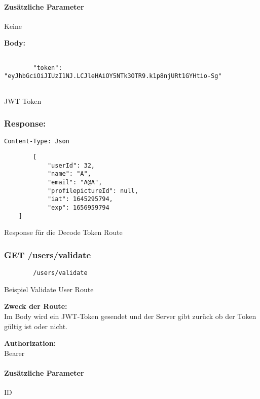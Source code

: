 \paragraph{Zusätzliche Parameter}
Keine

\textbf{Body:}

\begin{code}
    \begin{lstlisting}

        "token": "eyJhbGciOiJIUzI1NJ.LCJleHAiOY5NTk3OTR9.k1p8njURt1GYHtio-Sg"
        
    \end{lstlisting}
    \caption{JWT Token}
\end{code}

\subsubsection{Response:}

\begin{code}
    \lstinline{Content-Type: Json}
    \begin{lstlisting}
        [
            "userId": 32,
            "name": "A",
            "email": "A@A",
            "profilepictureId": null,
            "iat": 1645295794,
            "exp": 1656959794
    ]
    \end{lstlisting}
    \caption{Response für die Decode Token Route}
\end{code}

\pagebreak

\subsubsection{GET /users/validate}

\begin{code}
    \begin{lstlisting}
        /users/validate
    \end{lstlisting}
    \caption{Beispiel Validate User Route}
\end{code}

\textbf{Zweck der Route:} \\
Im Body wird ein JWT-Token gesendet und der Server gibt zurück ob der Token
gültig ist oder nicht.

\textbf{Authorization:} \\
Bearer

\paragraph{Zusätzliche Parameter}
ID

